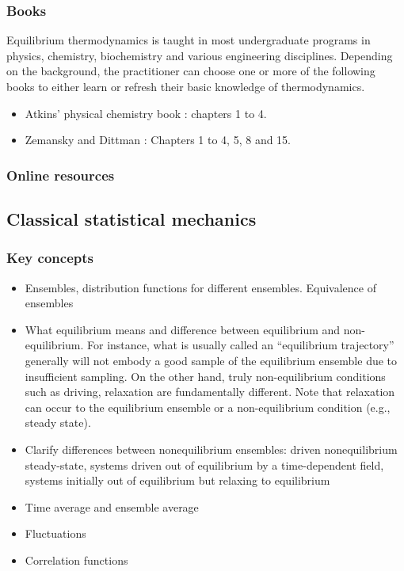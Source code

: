 \documentclass[9pt,bestpractices]{livecoms}
\begin{document}
\subsubsection{Books}
Equilibrium thermodynamics is taught in most undergraduate programs in physics, chemistry, biochemistry and various engineering disciplines. Depending on the background, the practitioner can choose one or more of the following books to either learn or refresh their basic knowledge of thermodynamics. 
\begin{itemize}
\item Atkins' physical chemistry book \cite{AtkinsBook} : chapters 1 to 4.
\item Zemansky and Dittman \cite{ZemanskyBook}: Chapters 1 to 4, 5, 8 and 15.
\end{itemize}
\subsubsection{Online resources}

\subsection{Classical statistical mechanics}
\label{sec:stat_mech}
\subsubsection{Key concepts}
\begin{itemize}
\item Ensembles, distribution functions for different ensembles. Equivalence of ensembles
\item What equilibrium means and difference between equilibrium and
    non-equilibrium. For instance, what is usually called an ``equilibrium
        trajectory'' generally will not embody a good sample of the equilibrium
        ensemble due to insufficient sampling.  On the other hand, truly
        non-equilibrium conditions such as driving, relaxation are fundamentally
        different.  Note that relaxation can occur to the equilibrium ensemble
        or a non-equilibrium condition (e.g., steady state).
\item Clarify differences between nonequilibrium ensembles: driven
    nonequilibrium steady-state, systems driven out of equilibrium by a
        time-dependent field, systems initially out of equilibrium but relaxing
        to equilibrium
\item Time average and ensemble average
\item Fluctuations
\item Correlation functions
\end{itemize}
\end{document}
